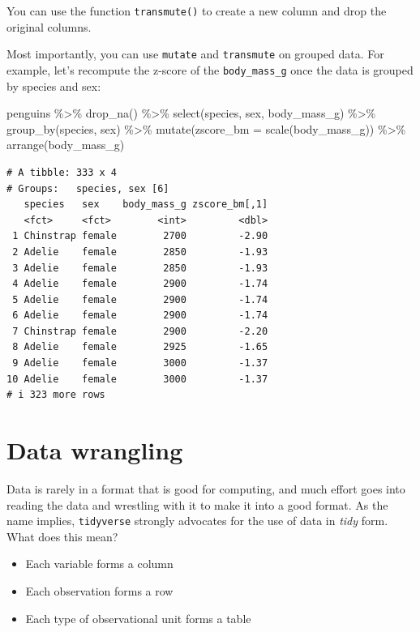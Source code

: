 \documentclass[
  letterpaper,
  DIV=11,
  numbers=noendperiod]{scrreprt}
\newenvironment{Shaded}{\begin{snugshade}}{\end{snugshade}}
\newcommand{\AttributeTok}[1]{\textcolor[rgb]{0.40,0.45,0.13}{#1}}
\newcommand{\FunctionTok}[1]{\textcolor[rgb]{0.28,0.35,0.67}{#1}}
\newcommand{\NormalTok}[1]{\textcolor[rgb]{0.00,0.23,0.31}{#1}}
\newcommand{\SpecialCharTok}[1]{\textcolor[rgb]{0.37,0.37,0.37}{#1}}
\providecommand{\tightlist}{%
  \setlength{\itemsep}{0pt}\setlength{\parskip}{0pt}}\usepackage{longtable,booktabs,array}
\begin{document}
You can use the function \texttt{transmute()} to create a new column and
drop the original columns.

Most importantly, you can use \texttt{mutate} and \texttt{transmute} on
grouped data. For example, let's recompute the z-score of the
\texttt{body\_mass\_g} once the data is grouped by species and sex:

\begin{Shaded}
\begin{Highlighting}[]
\NormalTok{penguins }\SpecialCharTok{\%\textgreater{}\%} 
  \FunctionTok{drop\_na}\NormalTok{() }\SpecialCharTok{\%\textgreater{}\%} 
  \FunctionTok{select}\NormalTok{(species, sex, body\_mass\_g) }\SpecialCharTok{\%\textgreater{}\%} 
  \FunctionTok{group\_by}\NormalTok{(species, sex) }\SpecialCharTok{\%\textgreater{}\%} 
  \FunctionTok{mutate}\NormalTok{(}\AttributeTok{zscore\_bm =} \FunctionTok{scale}\NormalTok{(body\_mass\_g)) }\SpecialCharTok{\%\textgreater{}\%} 
  \FunctionTok{arrange}\NormalTok{(body\_mass\_g)}
\end{Highlighting}
\end{Shaded}

\begin{verbatim}
# A tibble: 333 x 4
# Groups:   species, sex [6]
   species   sex    body_mass_g zscore_bm[,1]
   <fct>     <fct>        <int>         <dbl>
 1 Chinstrap female        2700         -2.90
 2 Adelie    female        2850         -1.93
 3 Adelie    female        2850         -1.93
 4 Adelie    female        2900         -1.74
 5 Adelie    female        2900         -1.74
 6 Adelie    female        2900         -1.74
 7 Chinstrap female        2900         -2.20
 8 Adelie    female        2925         -1.65
 9 Adelie    female        3000         -1.37
10 Adelie    female        3000         -1.37
# i 323 more rows
\end{verbatim}

\hypertarget{data-wrangling-1}{%
\section{Data wrangling}\label{data-wrangling-1}}

Data is rarely in a format that is good for computing, and much effort
goes into reading the data and wrestling with it to make it into a good
format. As the name implies, \texttt{tidyverse} strongly advocates for
the use of data in \emph{tidy} form. What does this mean?

\begin{itemize}
\tightlist
\item
  Each variable forms a column
\item
  Each observation forms a row
\item
  Each type of observational unit forms a table
\end{itemize}
\end{document}
